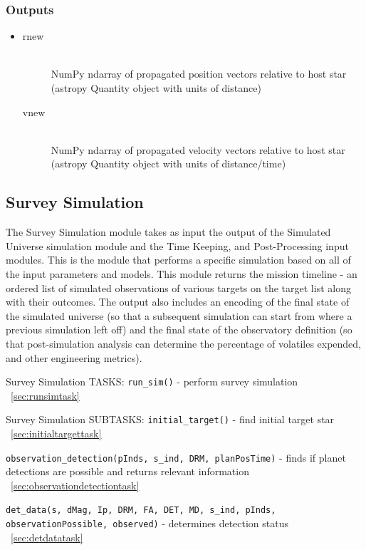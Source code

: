 \documentclass[cleanfoot]{asme2ej}
\begin{document}
\subsubsection*{Outputs}
\begin{itemize}
    \item 
    \begin{description}
        \item[rnew] \hfill \\
        NumPy ndarray of propagated position vectors relative to host star (astropy Quantity object with units of distance)
        \item[vnew] \hfill \\
        NumPy ndarray of propagated velocity vectors relative to host star (astropy Quantity object with units of distance/time)
    \end{description}
\end{itemize}


\subsection{Survey Simulation} \label{sec:surveysim}
The Survey Simulation module takes as input the output of the Simulated Universe simulation module and the Time Keeping, and Post-Processing input modules. This is the module that performs a specific simulation based on all of the input parameters and models. This module returns the mission timeline - an ordered list of simulated observations of various targets on the target list along with their outcomes.  The output also includes an encoding of the final state of the simulated universe (so that a subsequent simulation can start from where a previous simulation left off) and the final state of the observatory definition (so that post-simulation analysis can determine the percentage of volatiles expended, and other engineering metrics).

Survey Simulation TASKS: 
\verb+run_sim()+ - perform survey simulation ~\ref{sec:runsimtask}

Survey Simulation SUBTASKS:
\verb+initial_target()+ - find initial target star ~\ref{sec:initialtargettask}

\verb+observation_detection(pInds, s_ind, DRM, planPosTime)+ - finds if planet detections are possible and returns relevant information ~\ref{sec:observationdetectiontask}

\verb+det_data(s, dMag, Ip, DRM, FA, DET, MD, s_ind, pInds, observationPossible, observed)+ - determines detection status ~\ref{sec:detdatatask}
\end{document}
